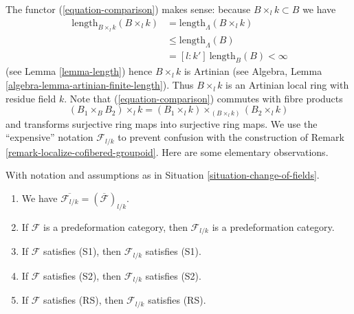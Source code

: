 \noindent
The functor (\ref{equation-comparison}) makes sense:
because $B \times_l k \subset B$ we have
\begin{align*}
[k : k']\ \text{length}_{B \times_l k}(B \times_l k) & =
\text{length}_\Lambda(B \times_l k) \\
& \leq \text{length}_\Lambda(B) \\
& = [l : k']\ \text{length}_B(B) < \infty
\end{align*}
(see Lemma \ref{lemma-length}) hence $B \times_l k$ is Artinian
(see Algebra, Lemma \ref{algebra-lemma-artinian-finite-length}).
Thus $B \times_l k$ is an Artinian local ring with
residue field $k$. Note that (\ref{equation-comparison})
commutes with fibre products
$$
(B_1 \times_B B_2) \times_l k =
(B_1 \times_l k) \times_{(B \times_l k)} (B_2 \times_l k)
$$
and transforms surjective ring maps into surjective ring maps.
We use the ``expensive'' notation $\mathcal{F}_{l/k}$ to prevent confusion
with the construction of Remark \ref{remark-localize-cofibered-groupoid}.
Here are some elementary observations.

\begin{lemma}
\label{lemma-elementary-properties-change-of-field}
With notation and assumptions as in Situation \ref{situation-change-of-fields}.
\begin{enumerate}
\item We have $\overline{\mathcal{F}_{l/k}} = (\overline{\mathcal{F}})_{l/k}$.
\item If $\mathcal{F}$ is a predeformation category, then $\mathcal{F}_{l/k}$
is a predeformation category.
\item If $\mathcal{F}$ satisfies (S1), then $\mathcal{F}_{l/k}$
satisfies (S1).
\item If $\mathcal{F}$ satisfies (S2), then $\mathcal{F}_{l/k}$
satisfies (S2).
\item If $\mathcal{F}$ satisfies (RS), then $\mathcal{F}_{l/k}$
satisfies (RS).
\end{enumerate}
\end{lemma}

